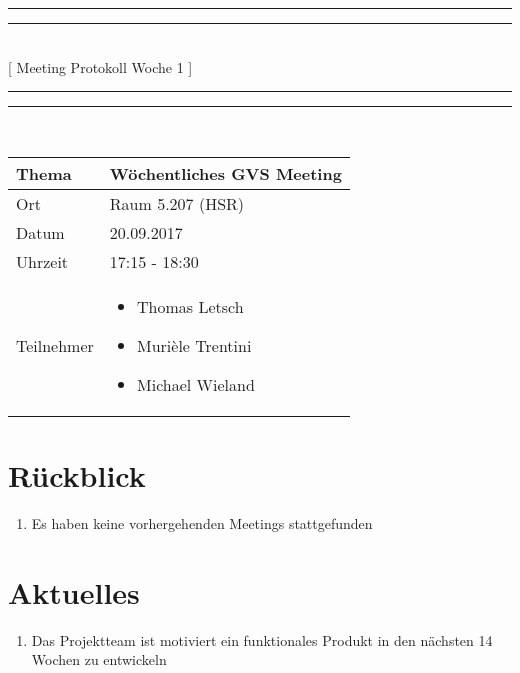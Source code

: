 \documentclass[11pt, a4paper,oneside]{scrartcl}
\begin{document}
\centering
\rule{\textwidth}{1.6pt}\vspace*{-\baselineskip}\vspace*{2pt} %
\rule{\textwidth}{0.4pt}\\[\baselineskip] %
{\LARGE [ Meeting Protokoll Woche 1 ]}\\[0.2\baselineskip] %
\rule{\textwidth}{0.4pt}\vspace*{-\baselineskip}\vspace{3.2pt} %
\rule{\textwidth}{1.6pt}\\[2\baselineskip] %

\begin{tabu} to \linewidth {l X }
	\toprule
	\textbf{Thema} & \textbf{Wöchentliches GVS Meeting} \\
	\midrule
	Ort & Raum 5.207 (HSR) \\
	Datum & 20.09.2017 \\
	Uhrzeit & 17:15 - 18:30 \\
	Teilnehmer & 
	\begin{minipage}[t]{\textwidth}
	  	\begin{itemize}
	  		\item Thomas Letsch
			\item Murièle Trentini
			\item Michael Wieland
	  	\end{itemize}
	\end{minipage}
	\\
	\bottomrule
\end{tabu}


\section{Rückblick}
\begin{enumerate}
	\item Es haben keine vorhergehenden Meetings stattgefunden
\end{enumerate}

\section{Aktuelles}
\begin{enumerate}
	\item Das Projektteam ist motiviert ein funktionales Produkt in den nächsten 14 Wochen zu entwickeln
\end{enumerate}
\end{document}
